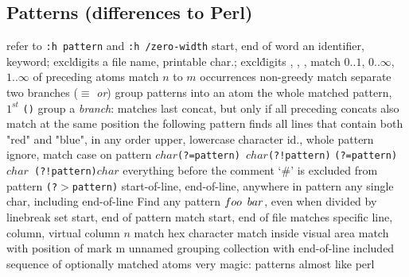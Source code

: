 \subsection{Patterns (differences to Perl)}	{refer to {\tt :h pattern} and {\tt :h /zero-width} }
\cmdOper{\bs$<$ \bs$>$ }	{start, end of word}
	{an identifier, keyword; excl\. digits}
	{a file name, printable char.; excl\. digits}
	{, , \key{\enter}, \key{$\gets$}}
\cmdOper{\bs = * \bs + }	{match $0..1$, $0..\infty$, $1..\infty$ of preceding atoms}
	{match $n$ to $m$ occurrences}
\cmdOper{\bs$\{-\}$ }	{non-greedy match}
\cmdOper{\bs$|$ }	{separate two branches ($\equiv$ {\it or\/})}
\cmdOper{\bs( \bs) }	{group patterns into an atom}
	{the whole matched pattern, $1^{st}$ {\tt()} group}
\cmdOper{\bs \& }	{a {\it branch}: matches last concat, but only if all preceding concats also match at the same position}
	{the following pattern finds all lines that contain both "red" and "blue", in any order}
	{upper, lowercase character}
	{id., whole pattern}
	{ignore, match case on pattern}
	{\tt $char$(?=pattern) $char$(?!pattern)\rm}
	{\tt (?=pattern)$char$ (?!pattern)$char$\rm}
	{everything before the
comment `\#' is excluded from pattern}
	{\tt (?$>$pattern)\rm }
\cmdOper{\bs\_\^{} \bs\_\$ }	{start-of-line, end-of-line, anywhere in pattern}
	{any single char, including end-of-line}
	{Find any pattern $foo\enskip bar$, even when divided by linebreak}
	{set start, end of pattern}
\cmdOper{\bs \%\^{} \bs\%\$ }	{match start, end of file}
	{matches specific line, column, virtual column $n$}
	{match hex character}
	{match inside visual area}
	{match with position of mark m}
\cmdOper{\bs\%(\bs) }	{unnamed grouping}
\cmdOper{\bs\_$[$ $]$ }	{collection with end-of-line included}
\cmdOper{\bs\%$[$ $]$ }	{sequence of optionally matched atoms}
	{very magic: patterns almost like perl}


